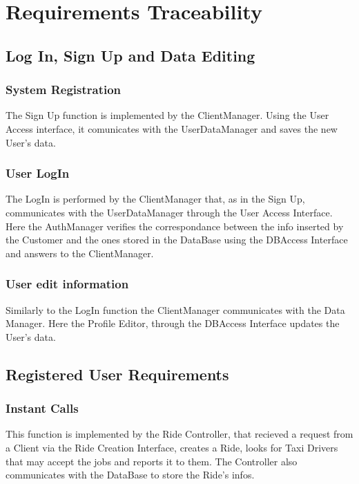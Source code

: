 \section{Requirements Traceability}
	\subsection {Log In, Sign Up and Data Editing}

		\subsubsection{System Registration}
		The Sign Up function is implemented by the ClientManager. Using the User Access interface, it comunicates with the UserDataManager and saves the new User's data.
		
		\subsubsection{User LogIn}
		The LogIn is performed by the ClientManager that, as in the Sign Up, communicates with the UserDataManager through the User Access Interface. Here the AuthManager verifies the correspondance between the info inserted by the Customer and the ones stored in the DataBase using the DBAccess Interface and answers to the ClientManager.
		
		\subsubsection{User edit information}
		Similarly to the LogIn function the ClientManager communicates with the Data Manager. Here the Profile Editor, through the DBAccess Interface updates the User's data.
		
		\newpage
	\subsection {Registered User Requirements}
	
		
		\subsubsection{Instant Calls}
		This function is implemented by the Ride Controller, that recieved a request from a Client via the Ride Creation Interface, creates a Ride, looks for Taxi Drivers that may accept the jobs and reports it to them. The Controller also communicates with the DataBase to store the Ride's infos. \askpippo
		
